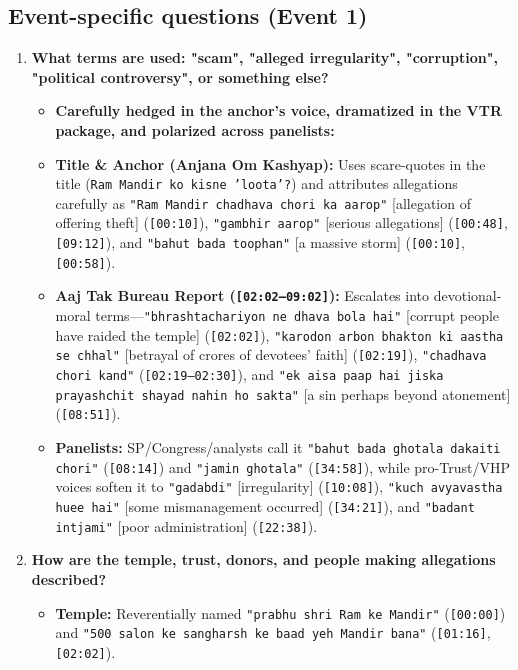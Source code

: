 \documentclass[10pt,a4paper]{article}
\begin{document}
\subsection*{Event-specific questions (Event 1)}
\begin{enumerate}[leftmargin=1.6em, itemsep=4pt, topsep=4pt]
  \item \textbf{What terms are used: "scam", "alleged irregularity", "corruption", "political controversy", or something else?}
  \begin{itemize}[leftmargin=1.4em, itemsep=2pt, topsep=2pt]
    \item \textbf{Carefully hedged in the anchor's voice, dramatized in the VTR package, and polarized across panelists:}
    \item \textbf{Title \& Anchor (Anjana Om Kashyap):} Uses scare-quotes in the title (\texttt{Ram Mandir ko kisne 'loota'?}) and attributes allegations carefully as \texttt{"Ram Mandir chadhava chori ka aarop"} [allegation of offering theft] (\texttt{[00:10]}), \texttt{"gambhir aarop"} [serious allegations] (\texttt{[00:48]}, \texttt{[09:12]}), and \texttt{"bahut bada toophan"} [a massive storm] (\texttt{[00:10]}, \texttt{[00:58]}).
    \item \textbf{Aaj Tak Bureau Report (\texttt{[02:02--09:02]}):} Escalates into devotional-moral terms---\texttt{"bhrashtachariyon ne dhava bola hai"} [corrupt people have raided the temple] (\texttt{[02:02]}), \texttt{"karodon arbon bhakton ki aastha se chhal"} [betrayal of crores of devotees' faith] (\texttt{[02:19]}), \texttt{"chadhava chori kand"} (\texttt{[02:19--02:30]}), and \texttt{"ek aisa paap hai jiska prayashchit shayad nahin ho sakta"} [a sin perhaps beyond atonement] (\texttt{[08:51]}).
    \item \textbf{Panelists:} SP/Congress/analysts call it \texttt{"bahut bada ghotala dakaiti chori"} (\texttt{[08:14]}) and \texttt{"jamin ghotala"} (\texttt{[34:58]}), while pro-Trust/VHP voices soften it to \texttt{"gadabdi"} [irregularity] (\texttt{[10:08]}), \texttt{"kuch avyavastha huee hai"} [some mismanagement occurred] (\texttt{[34:21]}), and \texttt{"badant intjami"} [poor administration] (\texttt{[22:38]}).
  \end{itemize}
  \item \textbf{How are the temple, trust, donors, and people making allegations described?}
  \begin{itemize}[leftmargin=1.4em, itemsep=2pt, topsep=2pt]
    \item \textbf{Temple:} Reverentially named \texttt{"prabhu shri Ram ke Mandir"} (\texttt{[00:00]}) and \texttt{"500 salon ke sangharsh ke baad yeh Mandir bana"} (\texttt{[01:16]}, \texttt{[02:02]}).

\end{itemize}
\end{enumerate}
\end{document}
